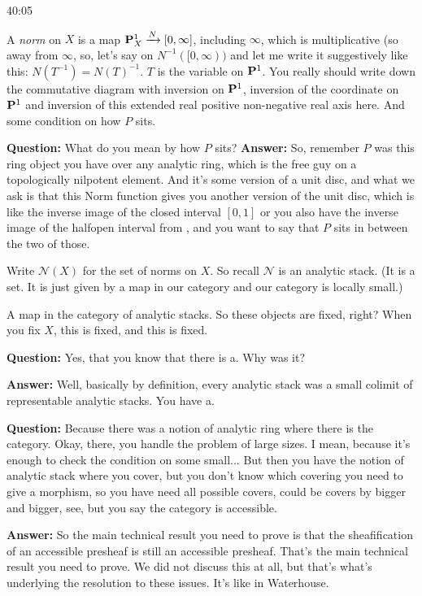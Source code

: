 \begin{example}
\begin{unfinished}{40:05}

A \emph{norm} on $X$ is a map $\P^1_X \xrightarrow{N} [0, \infty]$, including $\infty$, which is multiplicative (so away from $\infty$, so, let's say on $N^{-1} ([0, \infty))$ and let me write it suggestively like this: $N(T^{-1}) = N(T)^{-1}$. $T$ is the variable on $\P^1$. You really should write down the commutative diagram with inversion on $\P^1$, inversion of the coordinate on $\P^1$ and inversion of this extended real positive non-negative real axis here. 
And some condition on how $P$ sits.

\textbf{Question:} What do you mean by how $P$ sits?
\textbf{Answer:} So, remember $P$ was this ring object you have over any analytic ring, which is the free guy on a topologically nilpotent element. And it's some version of a unit disc, and what we ask is that this Norm function gives you another version of the unit disc, which is like the inverse image of the closed interval $[0, 1]$ or you also have the inverse image of the halfopen interval from , and you want to say that $P$ sits in between the two of those.

Write $\mathcal{N}(X)$ for the set of norms on $X$. So recall $\mathcal{N}$ is an analytic stack. (It is a set. It is just given by a map in our category and our category is locally small.)

A map in the category of analytic stacks. So these objects are fixed, right? When you fix $X$, this is fixed, and this is fixed. 

\textbf{Question:} Yes, that you know that there is a. Why was it? 

\textbf{Answer:} Well, basically by definition, every analytic stack was a small colimit of representable analytic stacks. You have a.

\textbf{Question:} Because there was a notion of analytic ring where there is the category. Okay, there, you handle the problem of large sizes. I mean, because it's enough to check the condition on some small... But then you have the notion of analytic stack where you cover, but you don't know which covering you need to give a morphism, so you have need all possible covers, could be covers by bigger and bigger, see, but you say the category is accessible. 

\textbf{Answer:}
So the main technical result you need to prove is that the sheafification of an accessible presheaf is still an accessible presheaf. That's the main technical result you need to prove. We did not discuss this at all, but that's what's underlying the resolution to these issues. It's like in Waterhouse.


\end{unfinished}
\end{example}
